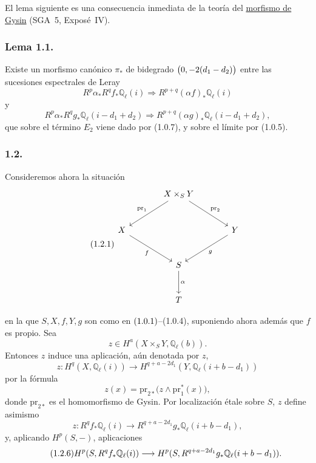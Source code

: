 El lema siguiente es una consecuencia inmediata de la teoría del
\underline{morfismo de Gysin} (SGA~5, Exposé~IV).

\subsubsection*{Lema 1.1.}
Existe un morfismo canónico $\pi_*$ de bidegrado
$\bigl(\sisi{a}{0},-2(d_1-d_2)\bigr)$ entre las sucesiones espectrales de
Leray
\begin{equation}\tag{1.1.0}
R^p\alpha_*R^qf_*\mathbb Q_\ell(i)\Longrightarrow
R^{p+q}(\alpha f)_*\mathbb Q_\ell(i)
\end{equation}
y
\begin{equation}\tag{1.1.1}
R^p\alpha_*R^qg_*\mathbb Q_\ell(i-d_1+d_2)\Longrightarrow
R^{p+q}(\alpha g)_*\mathbb Q_\ell(i-d_1+d_2),
\end{equation}
que sobre el término $E_2$ viene dado por (1.0.7), y sobre el límite por
(1.0.5).

\subsubsection*{1.2.}
Consideremos ahora la situación
\begin{equation}\tag{1.2.1}
\begin{tikzcd}[column sep=large,row sep=large]
{} & X\times_S Y \arrow[dl,"\mathrm{pr}_1"']
                  \arrow[dr,"\mathrm{pr}_2"] & {} \\
X \arrow[dr,"f"'] & {} & Y \arrow[dl,"g"] \\
{} & S \arrow[d,"\alpha"] & {} \\
{} & T & {}
\end{tikzcd}
\end{equation}

\pageoriginale

en la que $S,X,f,Y,g$ son como en
$\sisi{(1.0.2)}{(1.0.1)}$--(1.0.4), suponiendo ahora además que $f$ es
propio. Sea
\begin{equation}\tag{1.2.2}
z\in H^a(X\times_S Y,\mathbb Q_\ell(b)).
\end{equation}
Entonces $z$ induce una aplicación, aún denotada por $z$,
\begin{equation}\tag{1.2.3}
z:H^q(X,\mathbb Q_\ell(i))\longrightarrow
H^{q+a-2d_1}(Y,\mathbb Q_\ell(i+b-d_1))
\end{equation}
por la fórmula
\begin{equation}\tag{1.2.4}
z(x)=\mathrm{pr}_{2*}\bigl(z\wedge\mathrm{pr}_1^*(x)\bigr),
\end{equation}
donde $\mathrm{pr}_{2*}$ es el homomorfismo de Gysin. Por localización
étale sobre $S$, $z$ define asimismo
\begin{equation}\tag{1.2.5}
z:R^qf_*\mathbb Q_\ell(i)\longrightarrow
R^{q+a-2d_1}g_*\mathbb Q_\ell(i+b-d_1),
\end{equation}
y, aplicando $H^p(S,-)$, aplicaciones
\begin{equation}\tag{1.2.6}
H^p(S,R^qf_*\mathbb Q_\ell(i))\longrightarrow
H^p(S,R^{q+a-2d_1}g_*\mathbb Q_\ell(i+b-d_1)\sisi{}{)}.
\end{equation}

